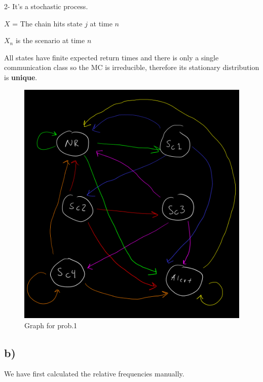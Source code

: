 \documentclass[]{article}
\begin{document}
2- It's a stochastic process.

\(X\) = The chain hits state \(j\) at time \(n\)

\(X_{n}\) is the scenario at time \(n\)

All states have finite expected return times and there is only a single
communication class so the MC is irreducible, therefore its stationary
distribution is \textbf{unique}.

\begin{figure}
\centering
\includegraphics{./grafo1.png}
\caption{Graph for prob.1}
\end{figure}

\newpage

\hypertarget{b}{%
\subsection{b)}\label{b}}

We have first calculated the relative frequencies manually.
\end{document}
